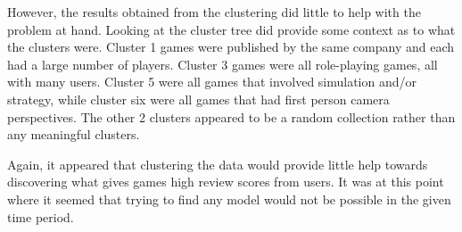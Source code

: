 \documentclass[models.tex]{subfiles}
\begin{document}
However, the results obtained from the clustering did little to help with the
problem at hand. Looking at the cluster tree did provide some context as to what
the clusters were. Cluster 1 games were published by the same company and each
had a large number of players. Cluster 3 games were all role-playing games, all
with many users. Cluster 5 were all games that involved simulation and/or
strategy, while cluster six were all games that had first person camera
perspectives. The other 2 clusters appeared to be a random collection rather
than any meaningful clusters.

Again, it appeared that clustering the data would provide little help towards
discovering what gives games high review scores from users. It was at this point
where it seemed that trying to find any model would not be possible in the given
time period.
\end{document}
